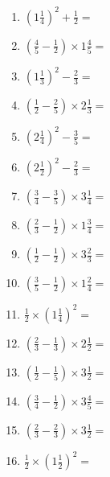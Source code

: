 \documentclass[12pt]{article}
\begin{document}
\begin{enumerate}
\item \large $ \left( 1 \frac{1}{4} \right)^2 + \frac{1}{2} = $ \vspace{1.6cm}
\item \large $ \left( \frac{4}{5} - \frac{1}{2} \right) \times 1 \frac{4}{5} = $ \vspace{1.6cm}
\item \large $ \left( 1 \frac{1}{3} \right)^2 - \frac{2}{3} = $ \vspace{1.6cm}
\item \large $ \left( \frac{1}{2} - \frac{2}{5} \right) \times 2 \frac{1}{3} = $ \vspace{1.6cm}
\item \large $ \left( 2 \frac{1}{4} \right)^2 - \frac{3}{5} = $ \vspace{1.6cm}
\item \large $ \left( 2 \frac{1}{2} \right)^2 - \frac{2}{3} = $ \vspace{1.6cm}
\newpage
\item \large $ \left( \frac{3}{4} - \frac{3}{5} \right) \times 3 \frac{1}{4} = $ \vspace{1.6cm}
\item \large $ \left( \frac{2}{3} - \frac{1}{2} \right) \times 1 \frac{3}{4} = $ \vspace{1.6cm}
\item \large $ \left( \frac{1}{2} - \frac{1}{2} \right) \times 3 \frac{2}{3} = $ \vspace{1.6cm}
\item \large $ \left( \frac{3}{5} - \frac{1}{2} \right) \times 1 \frac{2}{4} = $ \vspace{1.6cm}
\item \large $ \frac{1}{2} \times \left( 1 \frac{1}{4} \right)^2 = $ \vspace{1.6cm}
\item \large $ \left( \frac{2}{3} - \frac{1}{3} \right) \times 2 \frac{1}{2} = $ \vspace{1.6cm}
\item \large $ \left( \frac{1}{2} - \frac{1}{5} \right) \times 3 \frac{1}{2} = $ \vspace{1.6cm}
\item \large $ \left( \frac{3}{4} - \frac{1}{2} \right) \times 3 \frac{4}{5} = $ \vspace{1.6cm}
\item \large $ \left( \frac{2}{3} - \frac{2}{3} \right) \times 3 \frac{1}{2} = $ \vspace{1.6cm}
\item \large $ \frac{1}{2} \times \left( 1 \frac{1}{2} \right)^2 = $ \vspace{1.6cm}

\end{enumerate}
\end{document}
